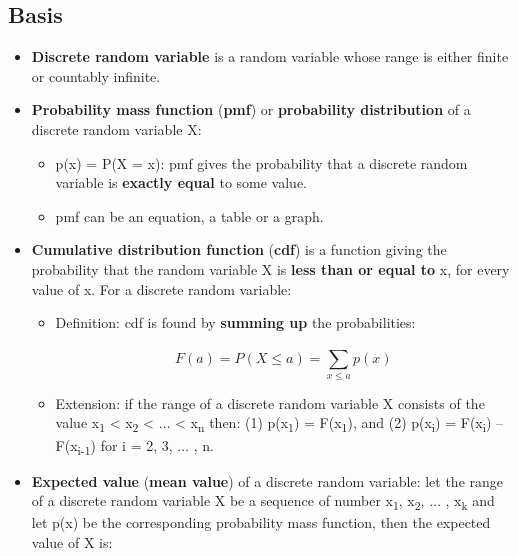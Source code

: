\documentclass[12pt]{report}
\renewcommand{\_}{\kern-1.5pt\textunderscore\kern-1.5pt}
\begin{document}
\subsection*{Basis}
\begin{itemize}
	\item \textbf{Discrete random variable} is a random variable whose range is either finite or countably infinite.\par

	\item \textbf{Probability mass function} (\textbf{pmf}) or \textbf{probability distribution} of a discrete random variable X:\par

\begin{itemize}
	\item p(x) = P(X = x): pmf gives the probability that a discrete random variable is \textbf{exactly equal} to some value.\par

	\item pmf can be an equation, a table or a graph.\par


\end{itemize}
	\item \textbf{Cumulative distribution function} (\textbf{cdf}) is a function giving the probability that the random variable X is \textbf{less than or equal to} x, for every value of x. For a discrete random variable:\par

\begin{itemize}
	\item Definition: cdf is found by \textbf{summing up} the probabilities:\par

 \[ F \left( a \right) =P \left( X \leq a \right) = \sum _{x \leq a}^{}p \left( x \right)  \] \par

	\item Extension: if the range of a discrete random variable X consists of the value x\textsubscript{1} < x\textsubscript{2} < $ \ldots $  < x\textsubscript{n} then: (1) p(x\textsubscript{1}) = F(x\textsubscript{1}), and (2) p(x\textsubscript{i}) = F(x\textsubscript{i}) – F(x\textsubscript{i-1}) for i = 2, 3, $ \ldots $ , n.\par


\end{itemize}
	\item \textbf{Expected value} (\textbf{mean value}) of a discrete random variable: let the range of a discrete random variable X be a sequence of number x\textsubscript{1}, x\textsubscript{2}, $ \ldots $ , x\textsubscript{k} and let p(x) be the corresponding probability mass function, then the expected value of X is:\par


\end{itemize}
\end{document}
